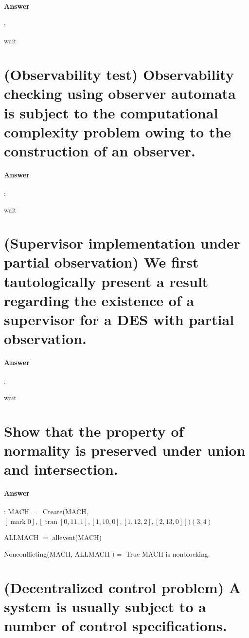 \documentclass{article}
\begin{document}
\paragraph{Answer}:

wait

\section{(Observability test) Observability checking using observer automata is subject to the computational complexity problem owing to the construction of an observer.}

\paragraph{Answer}:

wait

\section{(Supervisor implementation under partial observation) We first tautologically present a result regarding the existence of a supervisor for a DES with partial observation.}

\paragraph{Answer}:

wait

\section{Show that the property of normality is preserved under union and intersection.}

\paragraph{Answer}:
MACH $=$ Create(MACH, $[\operatorname{mark} 0],[\operatorname{tran}[0,11,1],[1,10,0],[1,12,2],[2,13,0]])(3,4)$

ALLMACH $=$ allevent(MACH)

Nonconflicting(MACH, ALLMACH $)=$ True $\mathrm{MACH}$ is nonblocking.

\section{(Decentralized control problem) A system is usually subject to a number of control specifications.}
\end{document}
